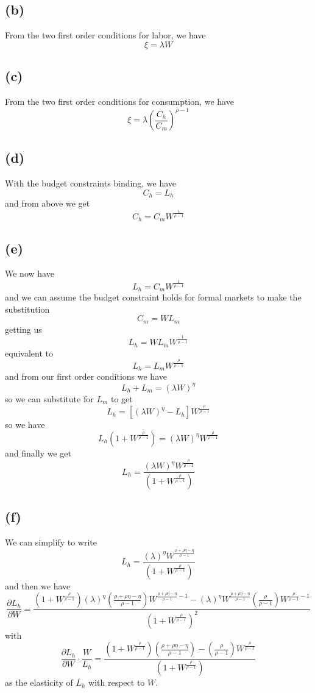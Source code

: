 \documentclass[11pt]{amsart}
\begin{document}
\subsection*{(b)}

From the two first order conditions for labor, we have 
\[
\xi = \lambda W
\]

\subsection*{(c)}

From the two first order conditions for consumption, we have
\[
\xi = \lambda \left( \frac{C_h}{C_m} \right)^{\rho-1}
\]

\subsection*{(d)}

With the budget constraints binding, we have
\[
C_h = L_h
\]
and from above we get
\[
C_h = C_m W^{\frac{1}{\rho-1}}
\]

\subsection*{(e)}

We now have
\[
L_h = C_m W^{\frac{1}{\rho-1}}
\]
and we can assume the budget constraint holds for formal markets to make the substitution
\[
C_m = WL_m
\]
getting us
\[
L_h = WL_m W^{\frac{1}{\rho-1}}
\]
equivalent to
\[
L_h = L_m W^{\frac{\rho}{\rho-1}}
\]
and from our first order conditions we have
\[
L_h + L_m = (\lambda W)^{\eta}
\]
so we can substitute for $L_m$ to get
\[
L_h =[(\lambda W)^{\eta} - L_h] W^{\frac{\rho}{\rho-1}}
\]
so we have
\[
L_h (1+ W^{\frac{\rho}{\rho-1}}) = (\lambda W)^{\eta} W^{\frac{\rho}{\rho-1}}
\]
and finally we get
\[
L_h = \frac{ (\lambda W)^{\eta} W^{\frac{\rho}{\rho-1}}}{(1+ W^{\frac{\rho}{\rho-1}})}
\]

\subsection*{(f)}

We can simplify to write 
\[
L_h = \frac{ (\lambda)^{\eta} W^{\frac{\rho + \rho \eta - \eta}{\rho-1}}}{(1+ W^{\frac{\rho}{\rho-1}})}
\]
and then we have
\[
\frac{\partial L_h}{\partial W} = \frac{(1+ W^{\frac{\rho}{\rho-1}}) (\lambda)^{\eta} (\frac{\rho + \rho \eta - \eta}{\rho-1}) W^{\frac{\rho + \rho \eta - \eta}{\rho-1} - 1} -  (\lambda)^{\eta} W^{\frac{\rho + \rho \eta - \eta}{\rho-1}} (\frac{\rho}{\rho-1}) W^{\frac{\rho}{\rho-1}  - 1}}{(1+ W^{\frac{\rho}{\rho-1}})^2}
\]
with 
\[
\frac{\partial L_h}{\partial W} \cdot \frac{W}{L_h} = \frac{(1+ W^{\frac{\rho}{\rho-1}})  (\frac{\rho + \rho \eta - \eta}{\rho-1})  -   (\frac{\rho}{\rho-1}) W^{\frac{\rho}{\rho-1} }}{(1+ W^{\frac{\rho}{\rho-1}})}
\]
as the elasticity of $L_h$ with respect to $W$.
\end{document}
